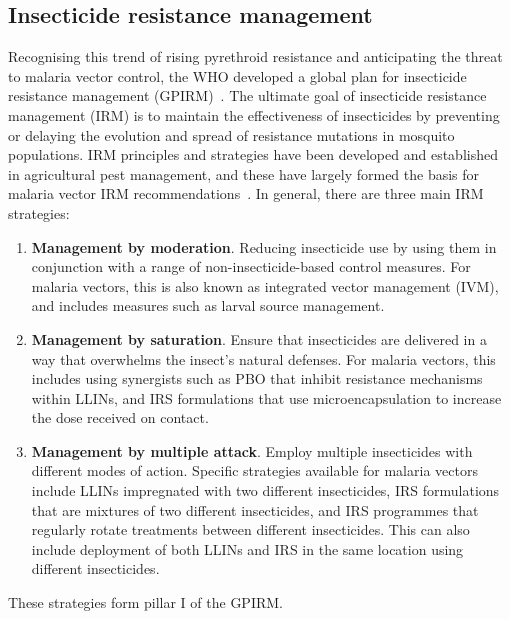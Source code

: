 \begin{refsection}
\section{Insecticide resistance management}\label{sec:IRM}


Recognising this trend of rising pyrethroid resistance and anticipating the threat to malaria vector control, the WHO developed a global plan for insecticide resistance management (GPIRM)~\parencite{WHO2012GPIRM}. 
%
The ultimate goal of insecticide resistance management (IRM) is to maintain the effectiveness of insecticides by preventing or delaying the evolution and spread of resistance mutations in mosquito populations. 
%
IRM principles and strategies have been developed and established in agricultural pest management, and these have largely formed the basis for malaria vector IRM recommendations~\parencite{Georghiou2005,Sternberg2018}. 
%
In general, there are three main IRM strategies:
%
\begin{enumerate}
%
\item \textbf{Management by moderation}.
%
Reducing insecticide use by using them in conjunction with a range of non-insecticide-based control measures.
%
For malaria vectors, this is also known as integrated vector management (IVM), and includes measures such as larval source management.
%
\item \textbf{Management by saturation}.
%
Ensure that insecticides are delivered in a way that overwhelms the insect's natural defenses.
%
For malaria vectors, this includes using synergists such as PBO that inhibit resistance mechanisms within LLINs, and  IRS formulations that use microencapsulation to increase the dose received on contact.
%
\item \textbf{Management by multiple attack}.
%
Employ multiple insecticides with different modes of action.
%
Specific strategies available for malaria vectors include LLINs impregnated with two different insecticides, IRS formulations that are mixtures of two different insecticides, and IRS programmes that regularly rotate treatments between different insecticides.
%
This can also include deployment of both LLINs and IRS in the same location using different insecticides.
%
\end{enumerate}
%
These strategies form pillar \RN{1} of the GPIRM.



\end{refsection}
